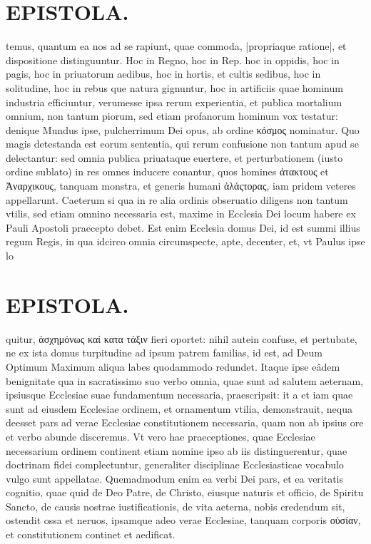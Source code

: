 \documentclass{article}
\begin{document}
\begin{pages}
\section*{EPISTOLA. }\pstart temus, quantum ea nos ad se rapiunt, quae commoda, |propriaque ratione|, et dispositione distinguuntur. Hoc in Regno, hoc in Rep. hoc in oppidis, hoc in pagis, hoc in priuatorum aedibus, hoc in hortis, et cultis sedibus, hoc in solitudine, hoc in rebus que natura gignuntur, hoc in artificiis quae hominum industria efficiuntur, verumesse ipsa rerum experientia, et publica mortalium omnium, non tantum piorum, sed etiam profanorum hominum vox testatur: denique Mundus ipse, pulcherrimum Dei opus, ab ordine κόσμος nominatur. Quo magis detestanda est eorum sententia, qui rerum confusione non tantum apud se delectantur: sed omnia publica priuataque euertere, et perturbationem (iusto ordine sublato) in res omnes inducere conantur, quos homines ἀτακτους et Ἀναρχικους, tanquam monstra, et generis humani ἀλάςτορας, iam pridem veteres appellarunt. Caeterum si qua in re alia ordinis obseruatio diligens non tantum vtilis, sed etiam omnino necessaria est, maxime in Ecclesia Dei locum habere ex Pauli Apostoli praecepto debet. Est enim Ecclesia domus Dei, id est summi illius regum Regis, in qua idcirco omnia circumspecte, apte, decenter, et, vt Paulus ipse lo\pend
\section*{EPISTOLA. }\pstart quitur, ἀσχημόνως καί κατα τάξιν fieri oportet: nihil autein confuse, et pertubate, ne ex ista domus turpitudine ad ipsum patrem familias, id est, ad Deum Optimum Maximum aliqua labes quodammodo redundet. Itaque ipse eâdem benignitate qua in sacratissimo suo verbo omnia, quae sunt ad salutem aeternam, ipsiusque Ecclesiae suae fundamentum necessaria, praescripsit: it a et iam quae sunt ad eiusdem Ecclesiae ordinem, et ornamentum vtilia, demonstrauit, nequa deesset pars ad verae Ecclesiae constitutionem necessaria, quam non ab ipsius ore et verbo abunde disceremus. Vt vero hae praeceptiones, quae Ecclesiae necessarium ordinem continent etiam nomine ipso ab iis distinguerentur, quae doctrinam fidei complectuntur, generaliter disciplinae Ecclesiasticae vocabulo vulgo sunt appellatae. Quemadmodum enim ea verbi Dei pars, et ea veritatis cognitio, quae quid de Deo Patre, de Christo, eiusque naturis et officio, de Spiritu Sancto, de causis nostrae iustificationis, de vita aeterna, nobis credendum sit, ostendit ossa et neruos, ipsamque adeo verae Ecclesiae, tanquam corporis οὐσίαν, et constitutionem continet et aedificat.  \pend

\end{pages}
\end{document}
